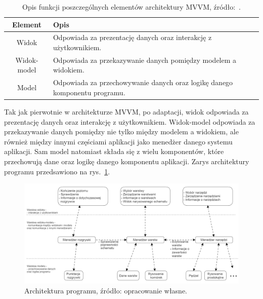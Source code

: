 \begin{table}[h]
    \centering
    \caption[Opis funkcji poszczególnych elementów architektury MVVM.]
    {Opis funkcji poszczególnych elementów architektury MVVM, źródło:~\cite{mvvm}.}
    \label{tab:mvvm}
    \begin{tabular}{|c|p{}|}
        \hline
        Element & Opis \\
        \hline
        \hline
        Widok & Odpowiada za prezentację danych oraz interakcję z użytkownikiem. \\
        \hline
        Widok-model & Odpowiada za przekazywanie danych pomiędzy modelem a widokiem. \\
        \hline
        Model & Odpowiada za przechowywanie danych oraz logikę danego komponentu programu. \\
        \hline
    \end{tabular}
\end{table}

Tak jak pierwotnie w architekturze MVVM, po adaptacji,
widok odpowiada za prezentację danych oraz interakcję z użytkownikiem.
Widok-model odpowiada za przekazywanie danych pomiędzy nie tylko między modelem a widokiem,
ale również między innymi częściami aplikacji jako menedżer danego systemu aplikacji.
Sam model natomiast składa się z wielu komponentów, które przechowują dane oraz logikę danego komponentu aplikacji.
Zarys architektury programu przedsawiono na rys.~\ref{fig:architektura}.

\begin{figure}[h]
    \centering
    \includegraphics[width=.9\textwidth]{chapters/chapter3/rys/arch}
    \caption[Architektura programu.]{Architektura programu, źródło: opracowanie własne.}
    \label{fig:architektura}
\end{figure}